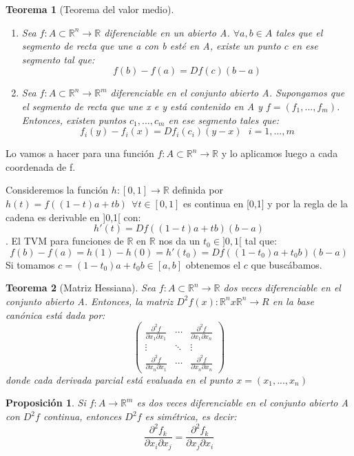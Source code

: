 \documentclass[11pt, a4paper]{article}
\makeatletter
\renewenvironment{proof}[1][\proofname] {\vspace{-15pt}\par\pushQED{\qed}\normalfont\topsep6\p@\@plus6\p@\relax\trivlist\item[\hskip\labelsep\it#1\@addpunct{.}]\ignorespaces}{\popQED\endtrivlist\@endpefalse}
\newcommand{\R}{\mathbb{R}}
\theoremstyle{theorem-style}
\newtheorem*{nth}{Teorema}
\newtheorem*{nprop}{Proposición}
\theoremstyle{definition-style}
\theoremstyle{remark-style}
\theoremstyle{example-style}
\newenvironment{nlist}
{\begin{enumerate}
\renewcommand\labelenumi{(\emph{\roman{enumi})}}}
{\end{enumerate}}
\makeatother
\begin{document}
\begin{nth}[Teorema del valor medio]\hfill\\
	\begin{nlist}
	\item Sea $f:A \subset \R^n\to \R$ diferenciable en un abierto A. $\forall a,b \in A$ tales que el segmento de recta que une a con b esté en A, existe un punto $c$ en ese segmento tal que:
	\[
	f(b)-f(a) = Df(c)(b-a)
	\]
	\item Sea $f:A \subset \R^n \to \R^m$ diferenciable en el conjunto abierto A. Supongamos que el segmento de recta que une x e y está contenido en A y $f=(f_1,...,f_m)$. Entonces, existen puntos $c_1,...,c_m$ en ese segmento tales que:
	\[
	f_i(y) - f_i(x) = Df_i(c_i)(y-x) \ \ \ i = 1,...,m
	\]
\end{nlist}
\end{nth}
\begin{proof}
	Lo vamos a hacer para una función $f:A \subset \R^n \to \R$ y lo aplicamos luego a cada coordenada de f.
	
	Consideremos la función $h:[0,1] \to \R$ definida por $h(t) = f((1-t)a +tb) \ \ \forall t \in [0,1]$ es continua en [0,1] y por la regla de la cadena es derivable en ]0,1[ con:
	\[
	h'(t) = Df((1-t)a +tb)(b-a)
	\].
	El TVM para funciones de $\R$ en $\R$ nos da un $t_0 \in ]0,1[$ tal que:
	\[
	f(b)-f(a) = h(1)-h(0) = h'(t_0) = Df((1-t_0)a+t_0b)(b-a)
	\]
	Si tomamos $c=(1-t_0)a+t_0b \in [a,b]$ obtenemos el $c$ que buscábamos.
	
\end{proof}

\begin{nth}[Matriz Hessiana]
	Sea $f:A\subset \R^n \to \R$ dos veces diferenciable en el conjunto abierto A. Entonces, la matriz $D^2f(x): \R^nx\R^n \to R$ en la base canónica está dada por:
	\[
	\begin{pmatrix}
 \frac{\partial^2 f}{\partial x_1 \partial x_1} & \cdots & \frac{\partial^2 f}{\partial x_1\partial x_n} \\
 \vdots & \ddots&\vdots \\
 \frac{\partial^2 f}{\partial x_n \partial x_1} & \cdots & \frac{\partial^2 f}{\partial x_n \partial x_n}
\end{pmatrix} 
	\]
	donde cada derivada parcial está evaluada en el punto $x=(x_1,...,x_n)$
\end{nth}

\begin{nprop}
	Si $f:A \to \R^m$ es dos veces diferenciable en el conjunto abierto A con $D^2 f$ continua, entonces $D^2f$ es simétrica, es decir:
	\[
	\frac{\partial^2 f_k}{\partial x_i \partial x_j} =  \frac{\partial^2 f_k}{\partial x_j \partial x_i}
	\]
\end{nprop}
\end{document}
